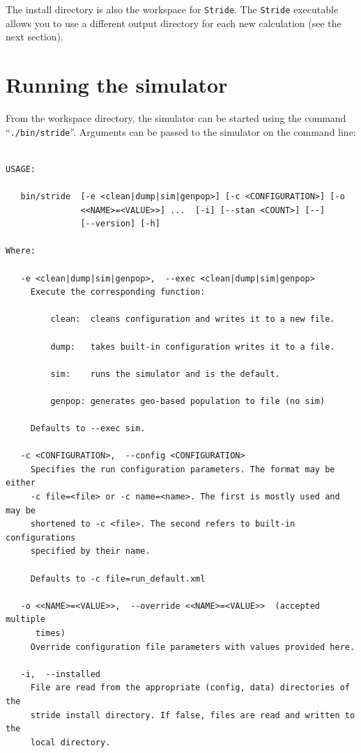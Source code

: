 The install directory is also the workspace for \texttt{Stride}. The \texttt{Stride} executable allows you to use a different output directory for each new calculation (see the next section).

\newpage
\section{Running the simulator}

From the workspace directory, the simulator can be started  using the command \mbox{``\texttt{./bin/stride}''}. Arguments can be passed to the simulator on the command line:
\begin{verbatim}

USAGE: 
 
   bin/stride  [-e <clean|dump|sim|genpop>] [-c <CONFIGURATION>] [-o
               <<NAME>=<VALUE>>] ...  [-i] [--stan <COUNT>] [--]
               [--version] [-h]
               
Where: 
 
   -e <clean|dump|sim|genpop>,  --exec <clean|dump|sim|genpop>
     Execute the corresponding function:  
 
         clean:  cleans configuration and writes it to a new file.  
 
         dump:   takes built-in configuration writes it to a file.  
 
         sim:    runs the simulator and is the default.  
 
         genpop: generates geo-based population to file (no sim)
 
     Defaults to --exec sim.
 
   -c <CONFIGURATION>,  --config <CONFIGURATION>
     Specifies the run configuration parameters. The format may be either
     -c file=<file> or -c name=<name>. The first is mostly used and may be
     shortened to -c <file>. The second refers to built-in configurations
     specified by their name.
 
     Defaults to -c file=run_default.xml
 
   -o <<NAME>=<VALUE>>,  --override <<NAME>=<VALUE>>  (accepted multiple
      times)
     Override configuration file parameters with values provided here.
 
   -i,  --installed
     File are read from the appropriate (config, data) directories of the
     stride install directory. If false, files are read and written to the
     local directory. 
 

\end{verbatim}
